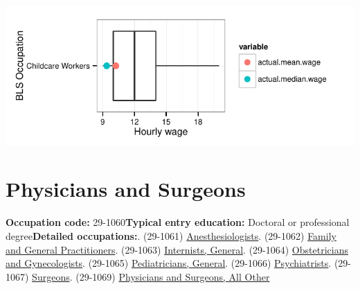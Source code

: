 \documentclass[a4paper,10pt]{article}\usepackage[]{graphicx}\usepackage[]{color}
\makeatletter
\def\maxwidth{ %
  \ifdim\Gin@nat@width>\linewidth
    \linewidth
  \else
    \Gin@nat@width
  \fi
}
\makeatother
\begin{document}
{\centering \includegraphics[width=\maxwidth]{figure/unnamed-chunk-248} 

}


\newpage\section{Physicians and Surgeons}\textbf{Occupation code:} 29-1060\newline\textbf{Typical entry education:} Doctoral or professional degree\newline\textbf{Detailed occupations:}. (29-1061)  \href{http://www.bls.gov/oes/current/oes291061.htm}{Anesthesiologists}. (29-1062)  \href{http://www.bls.gov/oes/current/oes291062.htm}{Family and General Practitioners}. (29-1063)  \href{http://www.bls.gov/oes/current/oes291063.htm}{Internists, General}. (29-1064)  \href{http://www.bls.gov/oes/current/oes291064.htm}{Obstetricians and Gynecologists}. (29-1065)  \href{http://www.bls.gov/oes/current/oes291065.htm}{Pediatricians, General}. (29-1066)  \href{http://www.bls.gov/oes/current/oes291066.htm}{Psychiatrists}. (29-1067)  \href{http://www.bls.gov/oes/current/oes291067.htm}{Surgeons}. (29-1069)  \href{http://www.bls.gov/oes/current/oes291069.htm}{Physicians and Surgeons, All Other}\newline%
\end{document}
